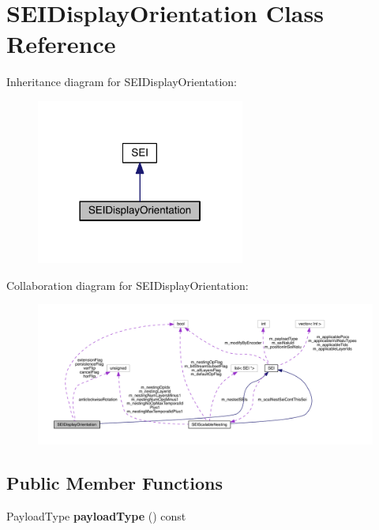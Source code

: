 \hypertarget{class_s_e_i_display_orientation}{}\section{S\+E\+I\+Display\+Orientation Class Reference}
\label{class_s_e_i_display_orientation}


Inheritance diagram for S\+E\+I\+Display\+Orientation\+:
\nopagebreak
\begin{figure}[H]
\begin{center}
\leavevmode
\includegraphics[width=194pt]{de/d96/class_s_e_i_display_orientation__inherit__graph}
\end{center}
\end{figure}


Collaboration diagram for S\+E\+I\+Display\+Orientation\+:
\nopagebreak
\begin{figure}[H]
\begin{center}
\leavevmode
\includegraphics[width=350pt]{d9/d70/class_s_e_i_display_orientation__coll__graph}
\end{center}
\end{figure}
\subsection*{Public Member Functions}
\begin{DoxyCompactItemize}
\item 
\mbox{\label{class_s_e_i_display_orientation_ac9abcb27f4a2b0555eb71cdb112a542b}} 
Payload\+Type {\bfseries payload\+Type} () const
\end{DoxyCompactItemize}
